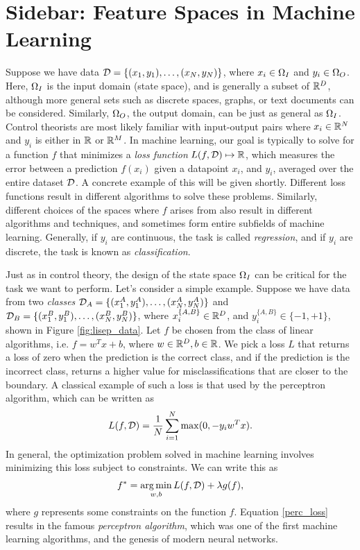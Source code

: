 \section[Feature Spaces in Machine Learning]{Sidebar: Feature Spaces in Machine Learning}\label{sb:featspace}
Suppose we have data $\mathcal{D} = \{(x_1,y_1), \dots, (x_{N},y_{N})\}$, where $x_i\in\Omega_I$ and $y_i\in\Omega_O$. Here, $\Omega_I$ is the input domain (state space), and 
is generally a subset of $\mathbb{R}^D$, although more general sets such as discrete spaces, graphs, or text documents can be considered.
Similarly, $\Omega_O$, the output domain, can be just as general as $\Omega_I$. Control theorists are most likely familiar with 
input-output pairs where $x_i\in\mathbb{R}^N$ and $y_i$ is either in $\mathbb{R}$ or $\mathbb{R}^M$. In machine learning, our goal is typically to solve for a function
$f$ that minimizes a \emph{loss function} $L(f, \mathcal{D})\mapsto\mathbb{R}$, which measures the error between a prediction $f(x_i)$ given a datapoint $x_i$, and $y_i$, averaged over the entire dataset $\mathcal{D}$. A concrete example of this will be given shortly.
Different loss functions result in different algorithms to solve these problems. Similarly, different choices of the spaces where $f$ arises from also 
result in different algorithms and techniques, and sometimes form entire subfields of machine learning. Generally, if $y_i$ are continuous, 
the task is called \emph{regression}, and if $y_i$ are discrete, the task is known as \emph{classification}. 

Just as in control theory, the design of the state space $\Omega_I$ can be critical for the task we want to perform. Let's consider a simple
example. Suppose we have data from two \emph{classes} $\mathcal{D}_A = \{(x_1^A, y_1^A), \dots, (x_N^A, y_N^A)\}$ and 
$\mathcal{D}_B = \{(x_1^B, y_1^B), \dots, (x_N^B, y_N^B)\}$, where $x_i^{\{A,B\}}\in\mathbb{R}^D$, and $y_i^{\{A,B\}}\in\{-1,+1\}$, shown
in Figure \ref{fig:lisep_data}. Let $f$ be chosen from the class of linear algorithms, i.e. $f = w^Tx + b$, where $w\in\mathbb{R}^D, b\in\mathbb{R}$. 
We pick a loss $L$ that returns a loss of zero when the prediction is the correct class, and if the prediction is the incorrect class,
returns a higher value for misclassifications that are closer to the boundary. A classical example of such a loss is that used by
the perceptron algorithm, which can be written as 
\begin{align}\eqlabel{perc_loss}
 L(f, \sampSetClass) = \frac{1}{\nsamp}\sum_{i=1}^N\max(0, -y_iw^Tx). 
\end{align}
In general, the optimization problem solved in machine learning involves minimizing this loss subject to constraints. We can write this as
\begin{align}
 f^* = \operatorname*{arg\,min}_{w,b} L(f, \mathcal{D}) + \lambda g(f),
\end{align}
where $g$ represents some constraints on the function $f$. Equation \eqref{perc_loss} results in the famous \emph{perceptron algorithm},
which was one of the first machine learning algorithms, and the genesis of modern neural networks. 

